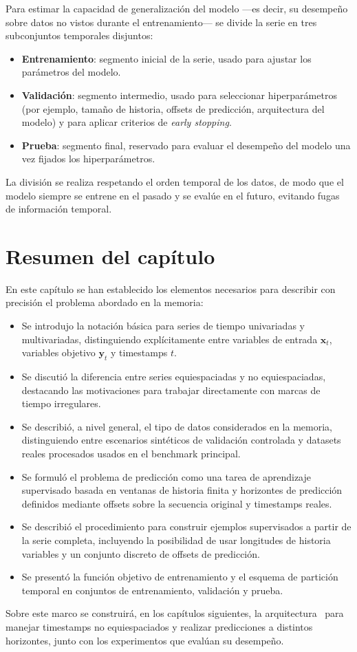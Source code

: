 Para estimar la capacidad de generalización del modelo —es decir, su desempeño sobre datos no vistos durante el entrenamiento— se divide la serie en tres subconjuntos temporales disjuntos:
\begin{itemize}
    \item \textbf{Entrenamiento}: segmento inicial de la serie, usado para ajustar los parámetros del modelo.
    \item \textbf{Validación}: segmento intermedio, usado para seleccionar hiperparámetros (por ejemplo, tamaño de historia, offsets de predicción, arquitectura del modelo) y para aplicar criterios de \emph{early stopping}.
    \item \textbf{Prueba}: segmento final, reservado para evaluar el desempeño del modelo una vez fijados los hiperparámetros.
\end{itemize}

La división se realiza respetando el orden temporal de los datos, de modo que el modelo siempre se entrene en el pasado y se evalúe en el futuro, evitando fugas de información temporal.

\section{Resumen del capítulo}

En este capítulo se han establecido los elementos necesarios para describir con precisión el problema abordado en la memoria:
\begin{itemize}
    \item Se introdujo la notación básica para series de tiempo univariadas y multivariadas, distinguiendo explícitamente entre variables de entrada $\mathbf{x}_t$, variables objetivo $\mathbf{y}_t$ y timestamps $t$.
    \item Se discutió la diferencia entre series equiespaciadas y no equiespaciadas, destacando las motivaciones para trabajar directamente con marcas de tiempo irregulares.
    \item Se describió, a nivel general, el tipo de datos considerados en la memoria, distinguiendo entre escenarios sintéticos de validación controlada y datasets reales procesados usados en el benchmark principal.
    \item Se formuló el problema de predicción como una tarea de aprendizaje supervisado basada en ventanas de historia finita y horizontes de predicción definidos mediante offsets sobre la secuencia original y timestamps reales.
    \item Se describió el procedimiento para construir ejemplos supervisados a partir de la serie completa, incluyendo la posibilidad de usar longitudes de historia variables y un conjunto discreto de offsets de predicción.
    \item Se presentó la función objetivo de entrenamiento y el esquema de partición temporal en conjuntos de entrenamiento, validación y prueba.
\end{itemize}

Sobre este marco se construirá, en los capítulos siguientes, la arquitectura \CTTransformer\ para manejar timestamps no equiespaciados y realizar predicciones a distintos horizontes, junto con los experimentos que evalúan su desempeño.
